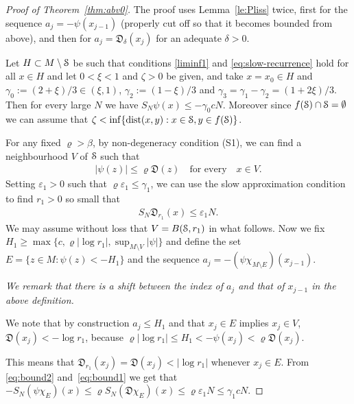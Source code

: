 \documentclass[reqno,12pt,a4paper]{amsart}
\theoremstyle{plain}
\theoremstyle{definition}
\begin{document}
\begin{proof}[Proof of Theorem~\ref{thm:abv0}]
The proof uses Lemma~\ref{le:Pliss} twice,
first for the sequence $a_j=-\psi(x_{j-1})$
(properly cut off so that it becomes bounded from above),
and then for $a_j={{\mathfrak D}}_\delta(x_j)$ for an adequate $\delta>0$.

Let $H\subset M\setminus{\EuScript{S}}$ be such that conditions
\eqref{liminf1} and \eqref{eq:slow-recurrence} hold for all
$x\in H$ and let $0<\xi<1$ and $\zeta>0$ be given, and take
$x=x_0\in H$ and $\gamma_0:=(2+\xi)/3\in(\xi,1)$,
$\gamma_2:=(1-\xi)/3$ and
$\gamma_3=\gamma_1-\gamma_2=(1+2\xi)/3$.  Then for every
large $N$ we have $S_N\psi(x) \le - \gamma_0 c N.$ Moreover
since $f({\EuScript{S}})\cap{\EuScript{S}}=\emptyset$ we can assume that
$\zeta<\inf\{{\operatorname{dist}}(x,y): x\in{\EuScript{S}}, y\in f({\EuScript{S}})\}$.

For any fixed ${\varrho}>\beta$, by non-degeneracy condition (S1),
we can find a neighbourhood $V$ of ${\EuScript{S}}$ such that
\begin{align}
\label{eq:bound2}
|\psi(z)|
\le {\varrho} {{\mathfrak D}}(z)\quad\text{for every}\quad
x\in V.
\end{align}
Setting $\varepsilon_1>0$ such that ${\varrho}\varepsilon_1
\le \gamma_1$, we can use the slow approximation condition to
find $r_1>0$ so small that
\begin{align}
  \label{eq:bound1}
S_N{{\mathfrak D}}_{r_1}(x) \le \varepsilon_1 N.
\end{align}
We may assume without loss that $V=B({\EuScript{S}},r_1)$ in what
follows.  Now we fix $H_1 \ge \max\{ c,{\varrho} |\log r_1|,
\sup_{M\setminus V} |\psi| \}$ and define the set $E=\{z\in
M: \psi(z)<-H_1\}$ and the sequence
$a_j=-(\psi\chi_{M\setminus E})(x_{j-1})$.

\emph{We remark that there is a shift between the index of
  $a_j$ and that of $x_{j-1}$ in the above definition. }

We note that by construction $a_j\le H_1$ and that $x_j\in
E$ implies $x_j\in V$, ${{\mathfrak D}}(x_j)<-\log r_1$, because ${\varrho}
|\log r_1| \le H_1 < -\psi(x_{j}) < {\varrho} {{\mathfrak D}}(x_j).$

This means that ${{\mathfrak D}}_{r_1}(x_j)={{\mathfrak D}}(x_j)<|\log r_1|$
whenever $x_j\in E$. From \eqref{eq:bound2}
and~\eqref{eq:bound1} we get that
$
  -S_N(\psi\chi_E)(x) \le {\varrho} S_N({{\mathfrak D}}\chi_E)(x)\le
  {\varrho}{\varepsilon}_1 N \le \gamma_1 c N.$


\end{proof}
\end{document}
